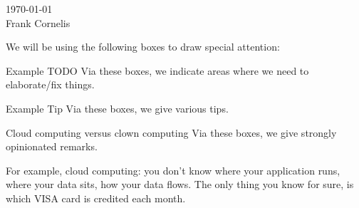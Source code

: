  \begin{flushright}
\today \\
Frank Cornelis 
\end{flushright}

We will be using the following boxes to draw special attention:
\begin{TODO}{Example TODO}
	Via these boxes, we indicate areas where we need to elaborate/fix things.
\end{TODO}
\begin{TIP}{Example Tip}
	Via these boxes, we give various tips.
\end{TIP}
\begin{ClownComputing}{Cloud computing versus clown computing}
	Via these boxes, we give strongly opinionated remarks.
	
	For example, cloud computing: you don't know where your application runs, where your data sits, how your data flows.
	The only thing you know for sure, is which VISA card is credited each month.  
\end{ClownComputing}